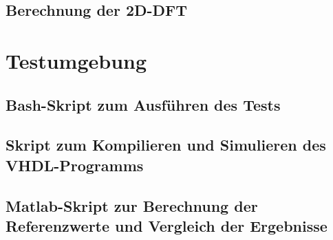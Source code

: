  \section{Berechnung der 2D-DFT}
 
 
 
 \chapter{Testumgebung}
 \section{Bash-Skript zum Ausführen des Tests}
 
 \section{Skript zum Kompilieren und Simulieren des VHDL-Programms}
 
 
 \section{Matlab-Skript zur Berechnung der Referenzwerte und Vergleich der Ergebnisse}
 
 